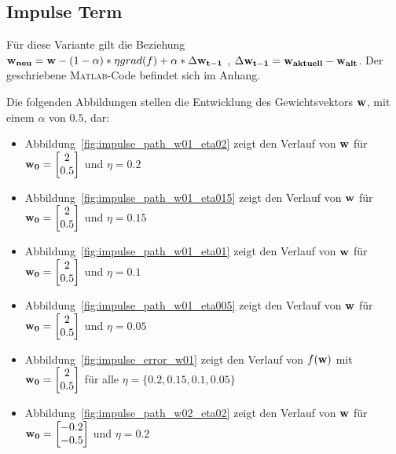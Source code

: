 \subsection{Impulse Term}

Für diese Variante gilt die Beziehung $ \mathbf{w_{neu}} = \mathbf{w} - (1- \alpha)* \eta grad(f)  + \alpha * \Delta \mathbf{w_{t-1}}$ ,
 $\Delta \mathbf{w_{t-1}} = \mathbf{w_{aktuell}} - \mathbf{w_{alt}} $. Der geschriebene \textsc{Matlab}-Code befindet sich im Anhang.

Die folgenden Abbildungen stellen die Entwicklung des Gewichtsvektors $\mathbf{w}$, mit einem $\alpha$ von $0.5$, dar:

\begin{itemize}
  \item Abbildung~\ref{fig:impulse_path_w01_eta02} zeigt den Verlauf von $\mathbf{w}$ für $\mathbf{w_0} = \begin{bmatrix} 2 \\ 0.5 \end{bmatrix}$ und $\eta = 0.2$
  \item Abbildung~\ref{fig:impulse_path_w01_eta015} zeigt den Verlauf von $\mathbf{w}$ für $\mathbf{w_0} = \begin{bmatrix} 2 \\ 0.5 \end{bmatrix}$ und $\eta = 0.15$
  \item Abbildung~\ref{fig:impulse_path_w01_eta01} zeigt den Verlauf von $\mathbf{w}$ für $\mathbf{w_0} = \begin{bmatrix} 2 \\ 0.5 \end{bmatrix}$ und $\eta = 0.1$
  \item Abbildung~\ref{fig:impulse_path_w01_eta005} zeigt den Verlauf von $\mathbf{w}$ für $\mathbf{w_0} = \begin{bmatrix} 2 \\ 0.5 \end{bmatrix}$ und $\eta = 0.05$
  \item Abbildung~\ref{fig:impulse_error_w01} zeigt den Verlauf von $f(\mathbf{w})$ mit $\mathbf{w_0} = \begin{bmatrix} 2 \\ 0.5 \end{bmatrix}$ für alle $\eta = \{0.2, 0.15, 0.1, 0.05\}$
  \item Abbildung~\ref{fig:impulse_path_w02_eta02} zeigt den Verlauf von $\mathbf{w}$ für $\mathbf{w_0} = \begin{bmatrix} -0.2 \\ -0.5 \end{bmatrix}$ und $\eta = 0.2$

\end{itemize}

